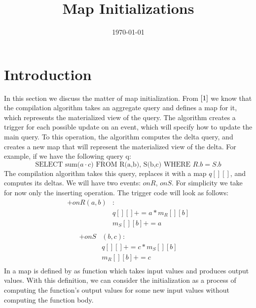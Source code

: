 \documentclass[12pt]{article}
\title{Map Initializations}
\date{\today}
\begin{document}
\maketitle
\section{Introduction}
In this section we discuss the matter of map initialization. From $\cite{1}$ we know that the compilation algorithm takes an aggregate query and defines a map for it, which represents the materialized view of the query. The algorithm creates a trigger for each possible update on an event, which will specify how to update the main query. To this operation, the algorithm computes the delta query, and creates a new map that will represent the materialized view of the delta. For example, if we have the following query q:
\begin{equation}
\mbox{SELECT sum(}a\cdot c\mbox{) FROM R(a,b), S(b,c) WHERE } R.b=S.b
\end{equation}
The compilation algorithm takes this query, replaces it with a map $q[][]$, and computes its deltas. We will have two events: $onR$, $onS$. For simplicity we take for now only the inserting operation. The trigger code will look as follows:
\begin{align*}
+onR(a,b)&:\\
&q[][]+=a*m_R[][b]\\
&m_S[][b]+=a\\
\end{align*}\vspace{-40pt}
\begin{align*}
+onS&(b,c):\\
&q[][]+=c*m_S[][b]\\
&m_R[][b]+=c\\
\end{align*}
In \cite{1} a map is defined by as function which takes input values and produces output values. With this definition, we can consider the initialization as a process of computing the function's output values for some new input values without computing the function body.
\end{document}

